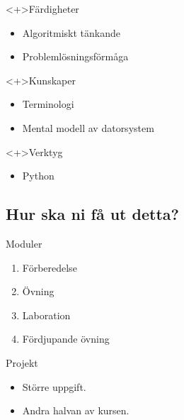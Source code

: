 \begin{frame}
  \begin{block}<+>{Färdigheter}
    \begin{itemize}
      \item Algoritmiskt tänkande
      \item Problemlösningsförmåga
    \end{itemize}
  \end{block}

  \begin{block}<+>{Kunskaper}
    \begin{itemize}
      \item Terminologi
      \item Mental modell av datorsystem
    \end{itemize}
  \end{block}

  \begin{block}<+>{Verktyg}
    \begin{itemize}
      \item Python
    \end{itemize}
  \end{block}
\end{frame}

\subsection{Hur ska ni få ut detta?}

\begin{frame}
  \begin{block}{Moduler}
    \begin{enumerate}
      \item Förberedelse
      \item Övning
      \item Laboration
      \item Fördjupande övning
    \end{enumerate}
  \end{block}

  \pause

  \begin{block}{Projekt}
    \begin{itemize}
      \item Större uppgift.
      \item Andra halvan av kursen.
    \end{itemize}
  \end{block}
\end{frame}

